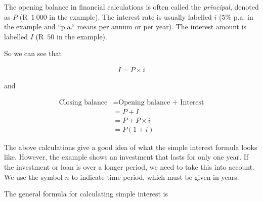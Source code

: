 The opening balance in financial calculations is often called the \textit{principal}, denoted as $P$ (R~$1~000$ in the example). The interest rate is usually labelled $i$ ($5\%$ p.a. in the example and ``p.a.`` means per annum or per year). The interest amount is labelled $I$ (R~$50$ in the example).\par 

So we can see that
        
\begin{align*}
    I = P \times i
\end{align*}

and

\begin{align*}
    \mbox{Closing balance} &= \mbox{Opening balance + Interest} \nonumber\\
    &= P + I \nonumber\\
    &= P + P \times i\nonumber\\
    &= P(1 + i)
\end{align*}



The above calculations give a good idea of what the simple interest
formula looks like. However, the example shows an investment that
lasts for only one year. If the investment or loan is over a longer
period, we need to take this into account. We use the symbol $n$ to
indicate time period, which must be given in years.\par

The general formula for calculating simple interest is



